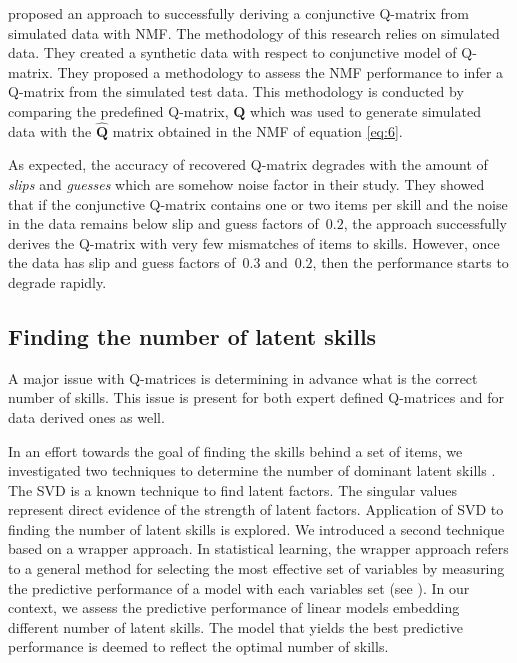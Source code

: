 \citet{desmarais2012mapping} proposed an approach to successfully deriving a conjunctive Q-matrix from simulated data with NMF. The methodology of this research relies on simulated data. They created a synthetic data with respect to conjunctive model of Q-matrix. They proposed a methodology to assess the NMF performance to infer a Q-matrix from the simulated test data. This methodology is conducted by comparing the predefined Q-matrix, $\mathbf{Q}$ which was used to generate simulated data with the $\hat{\mathbf{Q}}$ matrix obtained in the NMF of equation \ref{eq:6}.

As expected, the accuracy of recovered Q-matrix degrades with the amount of \textit{slips} and \textit{guesses} which are somehow noise factor in their study. They showed that if the conjunctive Q-matrix contains one or two items per skill and the noise in the data remains below slip and guess factors of~$0.2$, the approach successfully derives the Q-matrix with very few mismatches of items to skills. However, once the data has slip and guess factors of~$0.3$ and~$0.2$, then the performance starts to degrade rapidly.

\subsection{Finding the number of latent skills}
\label{EDM2012}

A major issue with Q-matrices is determining in advance what is the correct number of skills.  This issue is present for both expert defined Q-matrices and for data derived ones as well.

In an effort towards the goal of finding the skills behind a set of items, we  investigated two techniques to determine the number of dominant latent skills \citep{Beheshti2012Numbers}. The SVD is a known technique to find latent factors. The singular values represent direct evidence of the strength of latent factors. Application of SVD to finding the number of latent skills is explored. We introduced a second technique based on a wrapper approach. In statistical learning, the wrapper approach refers to a general method for selecting the most effective set of variables by measuring the predictive performance of a model with each variables set (see \citet{Guyon2003}). In our context, we assess the predictive performance of linear models embedding different number of latent skills. The model that yields the best predictive performance is deemed to reflect the optimal number of skills.



